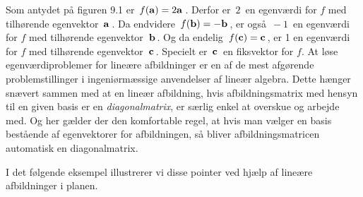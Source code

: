 Som antydet på figuren 9.1 er $\,f(\mathbf{a})=2\mathbf{a}\,$. Derfor er $\,2\,$ en egenværdi for $f$ med tilhørende egenvektor $\,\mathbf{a}\,$. Da endvidere $\,f(\mathbf{b})=-\mathbf{b}\,$, er også $\,-1\,$ en egenværdi for $f$ med tilhørende egenvektor $\,\mathbf{b}\,$. Og da endelig $\,f(\mathbf{c})=\mathbf{c}\,$, er 1 en egenværdi for $f$ med tilhørende egenvektor $\,\mathbf{c}\,$. Specielt er $\,\mathbf{c}\,$ en fiksvektor for $f$.\bs
At løse egenværdiproblemer for lineære afbildninger er en af de mest afgørende problemstillinger i ingeniørmæssige anvendelser af lineær algebra. Dette hænger snævert sammen med at en lineær afbildning, hvis afbildningsmatrix med hensyn til en given basis er en \textit{diagonalmatrix}, er særlig enkel at overskue og arbejde med. Og her gælder der den komfortable regel, at hvis man vælger en basis bestående af egenvektorer for afbildningen, så bliver afbildningsmatricen automatisk en diagonalmatrix.\bs

I det følgende eksempel illustrerer vi disse pointer ved hjælp af lineære afbildninger i planen.

